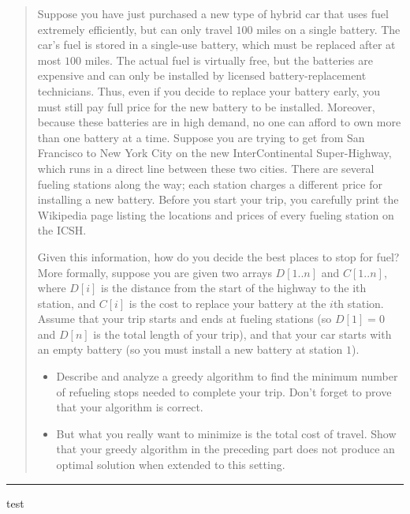 \documentclass[11pt]{article}
\begin{document}
\begin{quote}
Suppose you have just purchased a new type of hybrid car that
  uses fuel extremely efficiently, but can only travel $100$ miles on a
  single battery. The car’s fuel is stored in a single-use battery,
  which must be replaced after at most $100$ miles. The actual fuel is
  virtually free, but the batteries are expensive and can only be
  installed by licensed battery-replacement technicians. Thus, even if
  you decide to replace your battery early, you must still pay full
  price for the new battery to be installed. Moreover, because these
  batteries are in high demand, no one can afford to own more than one
  battery at a time.  Suppose you are trying to get from San Francisco
  to New York City on the new InterContinental Super-Highway, which
  runs in a direct line between these two cities. There are several
  fueling stations along the way; each station charges a different
  price for installing a new battery. Before you start your trip, you
  carefully print the Wikipedia page listing the locations and prices
  of every fueling station on the ICSH.

  Given this information, how do
  you decide the best places to stop for fuel?  More formally, suppose
  you are given two arrays $D[1 .. n]$ and $C[1 .. n]$, where $D[i]$ is the
  distance from the start of the highway to the ith station, and $C[i]$
  is the cost to replace your battery at the $i$th station. Assume that
  your trip starts and ends at fueling stations (so $D[1] = 0$ and $D[n]$
  is the total length of your trip), and that your car starts with an
  empty battery (so you must install a new battery at station $1$).


  \begin{itemize}
  \item   Describe and analyze a greedy algorithm to find the minimum number
  of refueling stops needed to complete your trip. Don’t forget to
  prove that your algorithm is correct.
\item But what you really want
  to minimize is the total cost of travel. Show that your greedy
  algorithm in the preceding part does not produce an optimal solution when
  extended to this setting.
  \end{itemize}
\end{quote}
\hrule



\begin{solution}
test
\end{solution}
\end{document}
